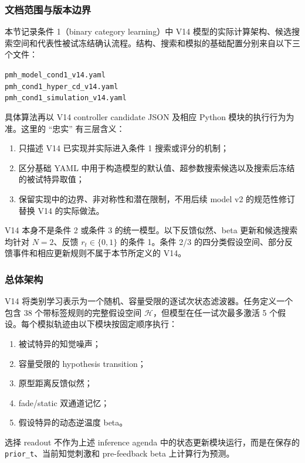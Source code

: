 
\subsubsection{文档范围与版本边界}

本节记录条件 1（binary category learning）中 V14 模型的实际计算架构、候选搜索空间和代表性被试冻结确认流程。结构、搜索和模拟的基础配置分别来自以下三个文件：
\begin{center}
\small
\texttt{pmh\_model\_cond1\_v14.yaml}\\
\texttt{pmh\_cond1\_hyper\_cd\_v14.yaml}\\
\texttt{pmh\_cond1\_simulation\_v14.yaml}
\end{center}
具体算法再以 V14 controller candidate JSON 及相应 Python 模块的执行行为为准。这里的 ``忠实'' 有三层含义：
\begin{enumerate}
    \item 只描述 V14 已实现并实际进入条件 1 搜索或评分的机制；
    \item 区分基础 YAML 中用于构造模型的默认值、超参数搜索候选以及搜索后冻结的被试特异取值；
    \item 保留实现中的边界、非对称性和潜在限制，不用后续 model v2 的规范性修订替换 V14 的实际做法。
\end{enumerate}

V14 本身不是条件 2 或条件 3 的统一模型。以下反馈似然、beta 更新和候选搜索均针对 $N=2$、反馈 $r_t\in\{0,1\}$ 的条件 1。条件 2/3 的四分类假设空间、部分反馈事件和相应更新规则不属于本节所定义的 V14。


\subsubsection{总体架构}

V14 将类别学习表示为一个随机、容量受限的逐试次状态滤波器。任务定义一个包含 38 个带标签规则的完整假设空间 $\mathcal H$，但模型在任一试次最多激活 5 个假设。每个模拟轨迹由以下模块按固定顺序执行：
\begin{enumerate}
    \item 被试特异的知觉噪声；
    \item 容量受限的 hypothesis transition；
    \item 原型距离反馈似然；
    \item fade/static 双通道记忆；
    \item 假设特异的动态逆温度 beta。
\end{enumerate}
选择 readout 不作为上述 inference agenda 中的状态更新模块运行，而是在保存的 \texttt{prior\_t}、当前知觉刺激和 pre-feedback beta 上计算行为预测。

